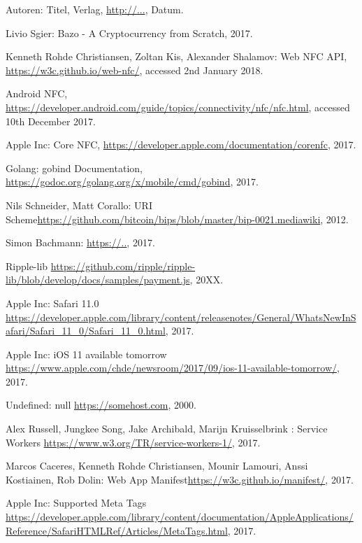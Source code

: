 \begin{thebibliography}{99}

 Autoren: Titel, Verlag, \url{http://...}, Datum.

 Livio Sgier: Bazo - A Cryptocurrency from Scratch, 2017.

 Kenneth Rohde Christiansen, Zoltan Kis, Alexander Shalamov: Web NFC API, \url{https://w3c.github.io/web-nfc/}, accessed 2nd January 2018.


 Android NFC, \url{https://developer.android.com/guide/topics/connectivity/nfc/nfc.html}, accessed 10th December 2017.

 Apple Inc: Core NFC, \url{https://developer.apple.com/documentation/corenfc}, 2017.

 Golang: gobind Documentation, \url{https://godoc.org/golang.org/x/mobile/cmd/gobind}, 2017.

 Nils Schneider, Matt Corallo: URI Scheme\url{https://github.com/bitcoin/bips/blob/master/bip-0021.mediawiki}, 2012.

 Simon Bachmann:  \url{https://..}, 2017.

 Ripple-lib  \url{https://github.com/ripple/ripple-lib/blob/develop/docs/samples/payment.js}, 20XX.

 Apple Inc: Safari 11.0  \url{https://developer.apple.com/library/content/releasenotes/General/WhatsNewInSafari/Safari_11_0/Safari_11_0.html}, 2017.

 Apple Inc: iOS 11 available tomorrow \url{https://www.apple.com/chde/newsroom/2017/09/ios-11-available-tomorrow/}, 2017.

 Undefined: null \url{https://somehost.com}, 2000.

 Alex Russell, Jungkee Song, Jake Archibald, Marijn Kruisselbrink : Service Workers \url{https://www.w3.org/TR/service-workers-1/}, 2017.

 Marcos Caceres, 
Kenneth Rohde Christiansen, Mounir Lamouri, Anssi Kostiainen, Rob Dolin: Web App Manifest\url{https://w3c.github.io/manifest/}, 2017.

 Apple Inc: Supported Meta Tags \url{https://developer.apple.com/library/content/documentation/AppleApplications/Reference/SafariHTMLRef/Articles/MetaTags.html}, 2017.


\end{thebibliography}
